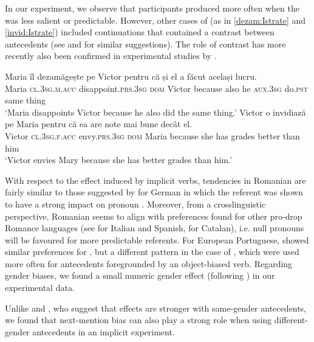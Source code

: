 \documentclass[output=paper,colorlinks,citecolor=brown]{langscibook}
\begin{document}
In our experiment, we observe that participants produced  more often when the  was less salient or predictable. However, other cases of  (as in \ref{dezam:Istrate} and \ref{invid:Istrate}) included continuations that contained a contrast between antecedents (see \citealt{dobrovie2013reference} and \citealt{mayol2010refining} for similar suggestions). The role of contrast has more recently also been confirmed in experimental studies by \citet{istrate2024subject}.

\ea 
\ea \gll Maria îl dezamăgește pe Victor {pentru că} și el a făcut același lucru.\\
Maria \textsc{cl.3sg.m.acc} disappoint.\textsc{prs.3sg} \textsc{dom} Victor because also he    \textsc{aux.3sg} do.\textsc{pst} same thing\\
\glt `Maria disappoints Victor because he also did the same thing.’ \label{dezam:Istrate}
\ex \gll Victor o invidiază pe Maria {pentru că} ea are note {mai bune} decât el.\\
Victor \textsc{cl.3sg.f.acc} envy.\textsc{prs.3sg} \textsc{dom} Maria because she has grades better than him\\
\glt `Victor envies Mary because she has better grades than him.’ \label{invid:Istrate}
\z
\z

With respect to the  effect induced by implicit  verbs, tendencies in Romanian are fairly similar to those suggested by \citet{bott2023production} for German in which the referent  was shown to have a strong impact on pronoun . Moreover, from a crosslinguistic perspective, Romanian seems to align with preferences found for other pro-drop Romance languages (see \citealt{contemori2021microvariation} for Italian and Spanish, \citealt{mayol2018asymmetries} for Catalan), i.e. null  pronouns will be favoured for more predictable referents. For European Portuguese, \citet{costa2004semantic} showed similar preferences for , but a different pattern in the case of , which were used more often for  antecedents foregrounded by an object-biased verb.
Regarding gender biases, we found a small numeric gender effect (following \citealt{ferstl2011implicit}) in our experimental data.

Unlike \citet{bott2023production} and \citet{rosa2017predictability}, who suggest that  effects are stronger with same-gender antecedents, we found that next-mention bias can also play a strong role when using different-gender antecedents in an implicit  experiment. 
\end{document}
